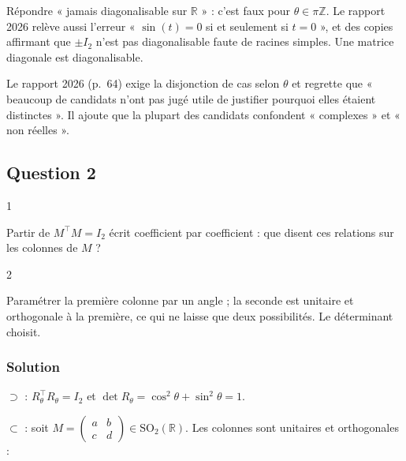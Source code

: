 \documentclass[11pt,a4paper]{article}
\begin{document}
\begin{piege}

Répondre « jamais diagonalisable sur \(\mathbb R\) » : c'est faux pour \(\theta\in\pi\mathbb Z\). Le rapport 2026 relève aussi l'erreur « \(\sin(t)=0\) si et seulement si \(t=0\) », et des copies affirmant que \(\pm I_2\) n'est pas diagonalisable faute de racines simples. Une matrice diagonale est diagonalisable.

\end{piege}

\begin{jury}

Le rapport 2026 (p.~64) exige la disjonction de cas selon \(\theta\) et regrette que « beaucoup de candidats n'ont pas jugé utile de justifier pourquoi elles étaient distinctes ». Il ajoute que la plupart des candidats confondent « complexes » et « non réelles ».

\end{jury}

\hypertarget{question-2}{%
\subsection{Question 2}\label{question-2}}

\begin{indication}{1}

Partir de \(M^\top M=I_2\) écrit coefficient par coefficient : que disent ces relations sur les colonnes de \(M\) ?

\end{indication}

\begin{indication}{2}

Paramétrer la première colonne par un angle ; la seconde est unitaire et orthogonale à la première, ce qui ne laisse que deux possibilités. Le déterminant choisit.

\end{indication}

\hypertarget{solution-1}{%
\subsubsection{Solution}\label{solution-1}}

\(\supset\) : \(R_\theta^\top R_\theta=I_2\) et \(\det R_\theta=\cos^2\theta+\sin^2\theta=1\).

\(\subset\) : soit \(M=\begin{pmatrix}a&b\\c&d\end{pmatrix}\in{\mathrm{SO}}_2(\mathbb R)\). Les colonnes sont unitaires et orthogonales :
\end{document}
